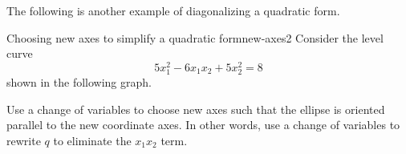 The following is another example of diagonalizing a quadratic form. 

\begin{example}{Choosing new axes to simplify a quadratic form}{new-axes2}
Consider the level curve
\begin{equation*}
5x_1^{2}-6x_1x_2+5x_2^{2}=8
\end{equation*} 
shown in the following graph. 

\begin{center}
\end{center}

Use a change of variables to choose new axes such that the ellipse is oriented parallel to the new coordinate axes. In other words, use a change of variables to rewrite $q$ to eliminate the $x_1x_2$ term. 
\end{example}

